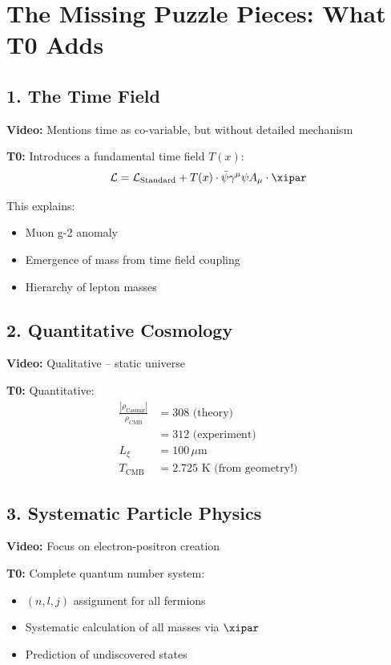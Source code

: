 	\section{The Missing Puzzle Pieces: What T0 Adds}
	
	\subsection{1. The Time Field}
	
	\textbf{Video:} Mentions time as co-variable, but without detailed mechanism
	
	\textbf{T0:} Introduces a fundamental time field $T(x)$:
	\begin{equation}
		\mathcal{L} = \mathcal{L}_{\text{Standard}} + T(x) \cdot \bar{\psi}\gamma^\mu\psi A_\mu \cdot \xipar
	\end{equation}
	
	This explains:
	\begin{itemize}
		\item Muon g-2 anomaly
		\item Emergence of mass from time field coupling
		\item Hierarchy of lepton masses
	\end{itemize}
	
	\subsection{2. Quantitative Cosmology}
	
	\textbf{Video:} Qualitative -- static universe
	
	\textbf{T0:} Quantitative:
	\begin{align}
		\frac{|\rho_{\text{Casimir}}|}{\rho_{\text{CMB}}} &= 308 \text{ (theory)} \\
		&= 312 \text{ (experiment)} \\
		L_\xi &= 100 \, \mu\text{m} \\
		T_{\text{CMB}} &= 2.725 \text{ K (from geometry!)}
	\end{align}
	
	\subsection{3. Systematic Particle Physics}
	
	\textbf{Video:} Focus on electron-positron creation
	
	\textbf{T0:} Complete quantum number system:
	\begin{itemize}
		\item $(n,l,j)$ assignment for all fermions
		\item Systematic calculation of all masses via $\xipar$
		\item Prediction of undiscovered states
	\end{itemize}
	
